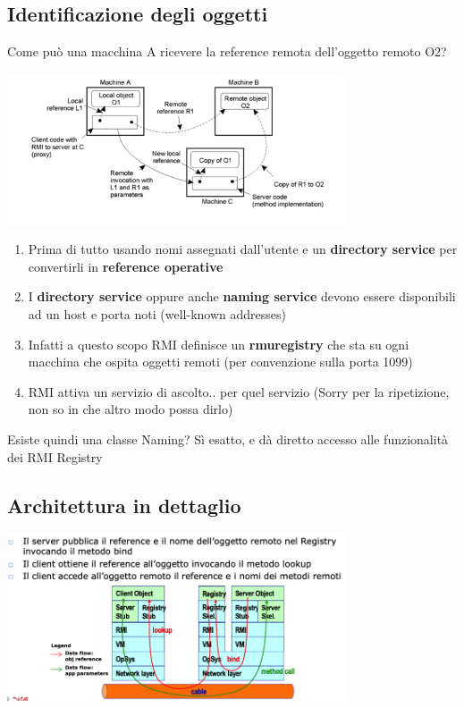 \documentclass[12pt, a4paper, openany, twoside]{book}
\begin{document}
\subsection{Identificazione degli oggetti}
Come può una macchina A ricevere la reference remota dell'oggetto remoto O2?
\begin{center}
\includegraphics[width=0.75\textwidth]{21}
\end{center}
\begin{enumerate}
	\item Prima di tutto usando nomi assegnati dall'utente e un 
	\textbf{directory service} per convertirli in \textbf{reference operative}
	\item I \textbf{directory service} oppure anche \textbf{naming service} devono
	essere disponibili ad un host e porta noti (well-known addresses)
	\item Infatti a questo scopo RMI definisce un \textbf{rmuregistry} che
	sta su ogni macchina che ospita oggetti remoti (per convenzione sulla porta
	1099)
	\item RMI attiva un servizio di ascolto.. per quel servizio (Sorry per la
	ripetizione, non so in che altro modo possa dirlo)
\end{enumerate}
Esiste quindi una classe Naming? Sì esatto, e dà diretto accesso alle funzionalità dei
RMI Registry
\subsection{Architettura in dettaglio}
\begin{center}
\includegraphics[width=0.75\textwidth]{22}
\end{center}
\end{document}
